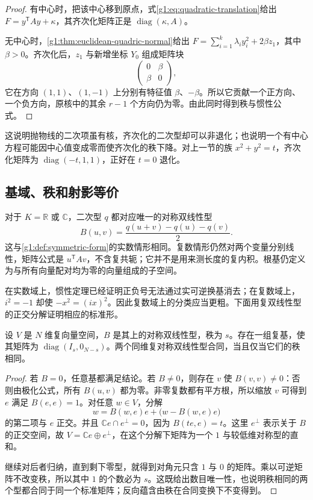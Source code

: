 \begin{proof}
	有中心时，把该中心移到原点，式\eqref{g1:eq:quadratic-translation}给出 \(F=y^{\mathsf T}Ay+\kappa\)，其齐次化矩阵正是 \(\operatorname{diag}(\kappa,A)\)。

	无中心时，\cref{g1:thm:euclidean-quadric-normal}给出 \(F=\sum_{i=1}^k\lambda_i y_i^2+2\beta z_1\)，其中 \(\beta>0\)。齐次化后，\(z_1\) 与新增坐标 \(Y_0\) 组成矩阵块
	\[
		\begin{pmatrix}0&\beta\\\beta&0\end{pmatrix},
	\]
	它在方向 \((1,1)\)、\((1,-1)\) 上分别有特征值 \(\beta\)、\(-\beta\)。所以它贡献一个正方向、一个负方向，原核中的其余 \(r-1\) 个方向仍为零。由此同时得到秩与惯性公式。
\end{proof}

这说明抛物线的二次项虽有核，齐次化的二次型却可以非退化；也说明一个有中心方程可能因中心值变成零而使齐次化的秩下降。对上一节的族 \(x^2+y^2=t\)，齐次化矩阵为 \(\operatorname{diag}(-t,1,1)\)，正好在 \(t=0\) 退化。

\subsection{基域、秩和射影等价}
\label{g1:subsec:0203:02}

对于 \(K=\mathbb R\) 或 \(\mathbb C\)，二次型 \(q\) 都对应唯一的对称双线性型
\[
	B(u,v)=\frac{q(u+v)-q(u)-q(v)}2.
\]
这与\cref{g1:def:symmetric-form}的实数情形相同。复数情形仍然对两个变量分别线性，矩阵公式是 \(u^{\mathsf T}Av\)，不含复共轭；它并不是用来测长度的复内积。根基仍定义为与所有向量配对均为零的向量组成的子空间。

\ProseParagraphBreak

在实数域上，惯性定理已经证明正负号无法通过实可逆换基消去；在复数域上，\(i^2=-1\) 却使 \(-x^2=(ix)^2\)。因此复数域上的分类应当更粗。下面用复双线性型的正交分解证明相应的标准形。

\begin{lemma}
	\label{g1:lem:complex-symmetric-normal}
	设 \(V\) 是 \(N\) 维复向量空间，\(B\) 是其上的对称双线性型，秩为 \(s\)。存在一组复基，使其矩阵为 \(\operatorname{diag}(I_s,0_{N-s})\)。两个同维复对称双线性型合同，当且仅当它们的秩相同。
\end{lemma}

\begin{proof}
	若 \(B=0\)，任意基都满足结论。若 \(B\ne0\)，则存在 \(v\) 使 \(B(v,v)\ne0\)：否则由极化公式，所有 \(B(u,v)\) 都为零。非零复数都有平方根，所以缩放 \(v\) 可得到 \(e\) 满足 \(B(e,e)=1\)。对任意 \(w\in V\)，分解
	\[
		w=B(w,e)e+\bigl(w-B(w,e)e\bigr)
	\]
	的第二项与 \(e\) 正交。并且 \(\mathbb Ce\cap e^\perp=0\)，因为 \(B(te,e)=t\)。这里 \(e^\perp\) 表示关于 \(B\) 的正交空间，故 \(V=\mathbb Ce\oplus e^\perp\)，在这个分解下矩阵为一个 \(1\) 与较低维对称型的直和。

	继续对后者归纳，直到剩下零型，就得到对角元只含 \(1\) 与 \(0\) 的矩阵。乘以可逆矩阵不改变秩，所以其中 \(1\) 的个数必为 \(s\)。这既给出数目唯一性，也说明秩相同的两个型都合同于同一个标准矩阵；反向蕴含由秩在合同变换下不变得到。
\end{proof}

